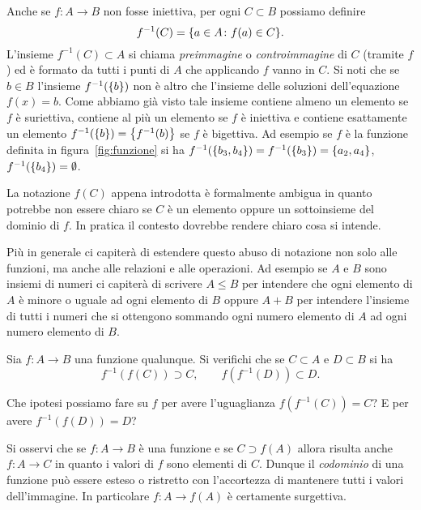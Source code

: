 Anche se $f\colon A \to B$ non fosse iniettiva,
per ogni $C\subset B$ possiamo definire
\[
  f^{-1}(C) = {\left\{ a\in A\colon f(a) \in C \right\}}.
\]
L'insieme $f^{-1}(C)\subset A$ si chiama \emph{preimmagine}
o \emph{controimmagine}
%
%
%
%
%
di $C$ (tramite $f$)
ed è formato da tutti i punti di $A$ che applicando $f$ vanno in $C$.
Si noti che se $b\in B$ l'insieme $f^{-1}({\left\{ b \right\}})$ non è altro che
l'insieme delle soluzioni dell'equazione $f(x)=b$. Come abbiamo
già visto tale insieme contiene almeno un elemento se $f$ è suriettiva,
contiene al più un elemento se $f$ è iniettiva e contiene esattamente
un elemento $f^{-1}({\left\{ b \right\}}) = {\left\{ f^{-1}(b) \right\}}$ se $f$ è bigettiva.
Ad esempio se $f$ è la funzione definita in figura~\ref{fig:funzione}
si ha $f^{-1}({\left\{ b_3,b_4 \right\}}) = f^{-1}({\left\{ b_3 \right\}}) = {\left\{ a_2,a_4 \right\}}$,
$f^{-1}({\left\{ b_4 \right\}}) = \emptyset$.


La notazione $f(C)$ appena introdotta è formalmente ambigua in quanto
potrebbe non essere chiaro se $C$ è un elemento oppure un sottoinsieme
del dominio di $f$.
In pratica il contesto dovrebbe rendere chiaro cosa si intende.

Più in generale ci capiterà di estendere questo abuso di notazione non solo
alle funzioni, ma anche alle relazioni e alle operazioni.
Ad esempio se $A$ e $B$ sono insiemi di numeri ci capiterà di scrivere $A\le B$
per intendere che ogni elemento di $A$ è minore o uguale ad ogni elemento di $B$
oppure $A+B$ per intendere l'insieme di tutti i numeri che si ottengono sommando
ogni numero elemento di $A$ ad ogni numero elemento di $B$.

\begin{exercise}
  Sia $f\colon A \to B$ una funzione qualunque. 
  Si verifichi che se $C\subset A$ e $D\subset B$ si ha 
  \[
    f^{-1}(f(C))\supset C,
    \qquad 
    f(f^{-1}(D)) \subset D. 
  \]
  
  Che ipotesi possiamo fare su $f$ per avere l'uguaglianza
  $f(f^{-1}(C)) = C$?
  E per avere $f^{-1}(f(D)) = D$?
\end{exercise}

Si osservi che se $f\colon A \to B$ è una funzione e 
se $C\supset f(A)$ allora risulta anche $f\colon A \to C$ in quanto 
i valori di $f$ sono elementi di $C$. 
Dunque il \emph{codominio} di una 
funzione può essere esteso o ristretto con l'accortezza di mantenere 
tutti i valori dell'immagine. 
In particolare $f\colon A \to f(A)$ è certamente surgettiva.

